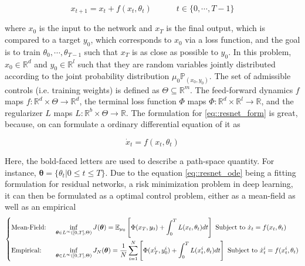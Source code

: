 \begin{equation} \label{eq::resnet_form}
    x_{t+1} = x_t + f(x_t,\theta_t) \quad \quad \quad t \in \{0,\cdots,T-1\}
\end{equation}

where $x_0$ is the input to the network and $x_T$ is the final output, which is compared to a target $y_0$, which corresponds to $x_0$ via a loss function, and the goal is to train $\theta_0,\cdots,\theta_{T-1}$ such that $x_T$ is as close as possible to $y_0$. In this problem,$x_0 \in \mathbb{R}^d$ and $y_0 \in \mathbb{R}^l$ such that they are random variables jointly distributed according to the joint probability distribution $\mu_0 \mathbb{P}_{(x_0,y_0)}$. The set of admissible controls (i.e. training weights) is defined as $\Theta \subseteq \mathbb{R}^m$. The feed-forward dynamics $f$ maps $f:\mathbb{R}^d \times \Theta \rightarrow \mathbb{R}^d$, the terminal loss function $\Phi$ maps $\Phi : \mathbb{R}^d \times \mathbb{R}^{l} \rightarrow \mathbb{R}$, and the regularizer $L$ maps $L:\mathbb{R}^b \times \Theta \rightarrow \mathbb{R}$. The formulation for \ref{eq::resnet_form} is great, because, on can formulate a ordinary differential equation of it as

\begin{equation} \label{eq::resnet_ode}
    \dot{x}_t = f(x_t,\theta_t)
\end{equation}

Here, the bold-faced letters are used to describe a path-space quantity. For instance, $\bm{\theta} = \{ \theta_t | 0 \leq t \leq T \}$. Due to the equation \ref{eq::resnet_ode} being a fitting formulation for residual networks, a risk minimization problem in deep learning, it can then be formulated as a optimal control problem, either as a mean-field as well as an empirical
\begin{equation*}
\begin{dcases}
\text{Mean-Field: } & \inf_{\bm{\theta} \in L^{\infty} ([0,T], \Theta)} J(\bm{\theta}) = \mathbb{E}_{\mu_0} \left[ \Phi (x_T,y_0) + \int_0^T L(x_t,\theta_t) dt \right]  \text{   Subject to } \dot{x}_t = f(x_t,\theta_t) \\
\text{Empirical: }  & \inf_{\bm{\theta} \in L^{\infty} ([0,T], \Theta)} J_N(\bm{\theta}) = \frac{1}{N} \sum_{i=1}^N \left[ \Phi (x_T^i,y_0^i) + \int_0^T L(x_t^i,\theta_t) dt \right] \text{   Subject to } \dot{x}^i_t = f(x_t^i,\theta_t) \\
\end{dcases}
\end{equation*}

